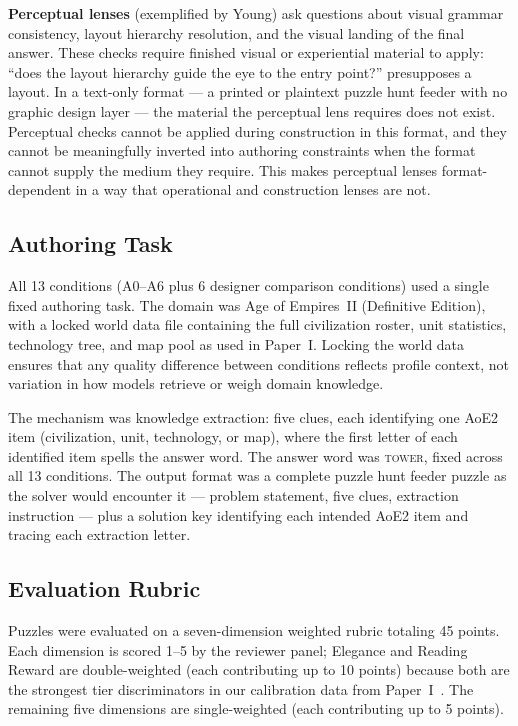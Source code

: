 \textbf{Perceptual lenses} (exemplified by Young) ask questions about visual grammar consistency, layout hierarchy resolution, and the visual landing of the final answer. These checks require finished visual or experiential material to apply: ``does the layout hierarchy guide the eye to the entry point?'' presupposes a layout. In a text-only format --- a printed or plaintext puzzle hunt feeder with no graphic design layer --- the material the perceptual lens requires does not exist. Perceptual checks cannot be applied during construction in this format, and they cannot be meaningfully inverted into authoring constraints when the format cannot supply the medium they require. This makes perceptual lenses format-dependent in a way that operational and construction lenses are not.

\subsection{Authoring Task}
\label{sec:task}

All 13 conditions (A0--A6 plus 6 designer comparison conditions) used a single fixed authoring task. The domain was Age of Empires~II (Definitive Edition), with a locked world data file containing the full civilization roster, unit statistics, technology tree, and map pool as used in Paper~I. Locking the world data ensures that any quality difference between conditions reflects profile context, not variation in how models retrieve or weigh domain knowledge.

The mechanism was knowledge extraction: five clues, each identifying one AoE2 item (civilization, unit, technology, or map), where the first letter of each identified item spells the answer word. The answer word was \textsc{tower}, fixed across all 13 conditions. The output format was a complete puzzle hunt feeder puzzle as the solver would encounter it --- problem statement, five clues, extraction instruction --- plus a solution key identifying each intended AoE2 item and tracing each extraction letter.

\subsection{Evaluation Rubric}
\label{sec:rubric}

Puzzles were evaluated on a seven-dimension weighted rubric totaling 45 points. Each dimension is scored 1--5 by the reviewer panel; Elegance and Reading Reward are double-weighted (each contributing up to 10 points) because both are the strongest tier discriminators in our calibration data from Paper~I~\cite{paper1}. The remaining five dimensions are single-weighted (each contributing up to 5 points).

